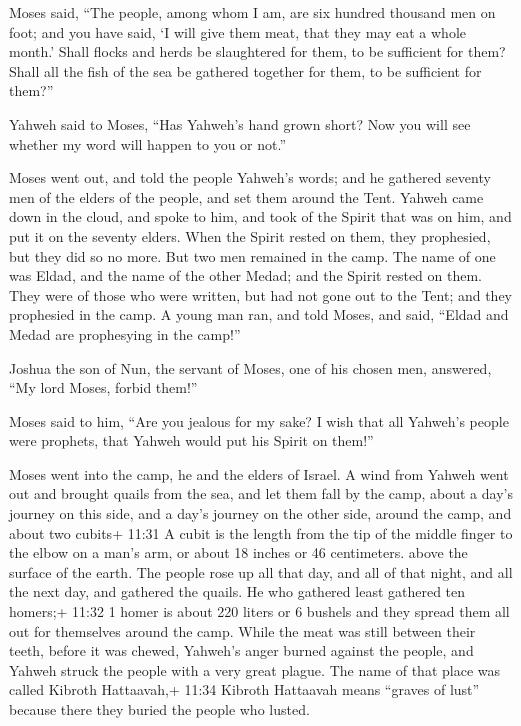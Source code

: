  Moses said, ``The people, among whom I am, are six hundred
thousand men on foot; and you have said, `I will give them meat, that
they may eat a whole month.'  Shall flocks and herds be
slaughtered for them, to be sufficient for them? Shall all the fish of
the sea be gathered together for them, to be sufficient for them?''

 Yahweh said to Moses, ``Has Yahweh's hand grown short? Now
you will see whether my word will happen to you or not.''

 Moses went out, and told the people Yahweh's words; and he
gathered seventy men of the elders of the people, and set them around
the Tent.  Yahweh came down in the cloud, and spoke to him,
and took of the Spirit that was on him, and put it on the seventy
elders. When the Spirit rested on them, they prophesied, but they did so
no more.  But two men remained in the camp. The name of one
was Eldad, and the name of the other Medad; and the Spirit rested on
them. They were of those who were written, but had not gone out to the
Tent; and they prophesied in the camp.  A young man ran,
and told Moses, and said, ``Eldad and Medad are prophesying in the
camp!''

 Joshua the son of Nun, the servant of Moses, one of his
chosen men, answered, ``My lord Moses, forbid them!''

 Moses said to him, ``Are you jealous for my sake? I wish
that all Yahweh's people were prophets, that Yahweh would put his Spirit
on them!''

 Moses went into the camp, he and the elders of Israel.
 A wind from Yahweh went out and brought quails from the
sea, and let them fall by the camp, about a day's journey on this side,
and a day's journey on the other side, around the camp, and about two
cubits+ 11:31 A cubit is the length from the tip of the middle finger to
the elbow on a man's arm, or about 18 inches or 46 centimeters. above
the surface of the earth.  The people rose up all that day,
and all of that night, and all the next day, and gathered the quails. He
who gathered least gathered ten homers;+ 11:32 1 homer is about 220
liters or 6 bushels and they spread them all out for themselves around
the camp.  While the meat was still between their teeth,
before it was chewed, Yahweh's anger burned against the people, and
Yahweh struck the people with a very great plague.  The
name of that place was called Kibroth Hattaavah,+ 11:34 Kibroth
Hattaavah means ``graves of lust'' because there they buried the people
who lusted.

